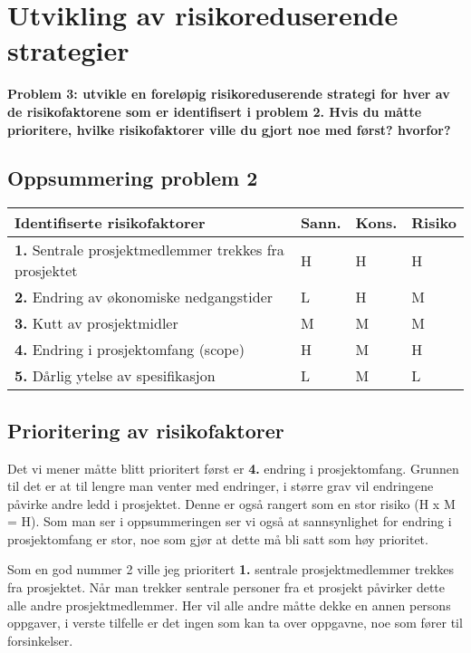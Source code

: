 \section{Utvikling av risikoreduserende strategier}

	{\bf Problem 3: utvikle en foreløpig risikoreduserende strategi for hver av de risikofaktorene 
	som er identifisert i problem 2. Hvis du måtte prioritere, hvilke risikofaktorer ville du 
	gjort noe med først? hvorfor?}

	\subsection{Oppsummering problem 2}
	\begin{table}[H]
		\begin{tabular}{ p{9cm} l l l}
			\hline
			Identifiserte risikofaktorer & Sann. & Kons. & Risiko \\ \hline
			{\bf 1.} Sentrale prosjektmedlemmer trekkes fra prosjektet & H & H & H \\
			{\bf 2.} Endring av økonomiske nedgangstider & L & H & M \\
			{\bf 3.} Kutt av prosjektmidler & M & M & M \\
			{\bf 4.} Endring i prosjektomfang (scope) & H & M & H \\
			{\bf 5.} Dårlig ytelse av spesifikasjon & L & M & L \\
			\hline
		\end{tabular}
	\end{table}

	\subsection{Prioritering av risikofaktorer}

		Det vi mener måtte blitt prioritert først er {\bf 4.} endring i prosjektomfang. Grunnen 
		til det er at til lengre man venter med endringer, i større grav vil endringene påvirke
		andre ledd i prosjektet. Denne er også rangert som en stor risiko (H x M = H).
		Som man ser i oppsummeringen ser vi også at sannsynlighet for endring i prosjektomfang er
		stor, noe som gjør at dette må bli satt som høy prioritet. 

		Som en god nummer 2 ville jeg prioritert {\bf 1.} sentrale prosjektmedlemmer trekkes fra 
		prosjektet. Når man trekker sentrale personer fra et prosjekt påvirker dette alle
		andre prosjektmedlemmer. Her vil alle andre måtte dekke en annen persons oppgaver, 
		i verste tilfelle er det ingen som kan ta over oppgavne, noe som fører til forsinkelser.

